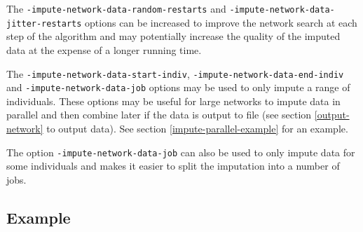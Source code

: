 \documentclass[a4paper,12pt]{article}
\newcommand{\code}[1]{{\footnotesize{{\tt #1}}}}
\begin{document}
The \code{-impute-network-data-random-restarts} and \code{-impute-network-data-jitter-restarts} options can be increased to improve the network search at each step of the algorithm and may potentially increase the quality of the imputed data at the expense of a longer running time. 

The \code{-impute-network-data-start-indiv}, \code{-impute-network-data-end-indiv} and \code{-impute-network-data-job} options may be used to only impute a range of individuals. These options may be useful for large networks to impute data in parallel and then combine later if the data is output to file (see  section \ref{output-network} to output data). See  section \ref{impute-parallel-example} for an example. 

The option \code{-impute-network-data-job} can also be used to only impute data for some individuals and makes it easier to split the imputation into a number of jobs. 


\subsection{Example}
\label{impute-example}
\end{document}
